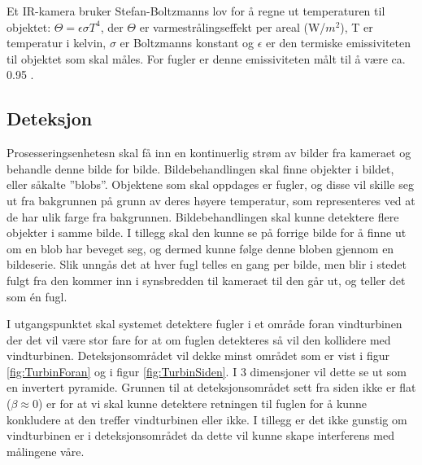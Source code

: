 Et IR-kamera bruker Stefan-Boltzmanns lov for å regne ut temperaturen til objektet: $\Theta=\epsilon \sigma T^4$, der $\Theta$ er varmestrålingseffekt per areal (W/$m^2$), T er temperatur i kelvin, $\sigma$ er Boltzmanns konstant og $\epsilon$ er den termiske emissiviteten til objektet som skal måles. For fugler er denne emissiviteten målt til å være ca. 0.95 \cite{fuglemm}.


\subsection{Deteksjon}

Prosesseringsenhetesn skal få inn en kontinuerlig strøm av bilder fra kameraet og behandle denne bilde for bilde. Bildebehandlingen skal finne objekter i bildet, eller såkalte ''blobs''. Objektene som skal oppdages er fugler, og disse vil skille seg ut fra bakgrunnen på grunn av deres høyere temperatur, som representeres ved at de har ulik farge fra bakgrunnen. Bildebehandlingen skal kunne detektere flere objekter i samme bilde. I tillegg skal den kunne se på forrige bilde
for å finne ut om en blob har beveget seg, og dermed kunne følge denne bloben gjennom en bildeserie. Slik unngås det at hver fugl telles en gang per bilde, men blir i stedet fulgt fra den kommer inn i synsbredden til kameraet til den går ut, og teller det som én fugl.

I utgangspunktet skal systemet detektere fugler i et område foran vindturbinen der det vil være stor fare for at om fuglen detekteres så vil den kollidere med vindturbinen. Deteksjonsområdet vil dekke minst området som er vist i figur \ref{fig:TurbinForan} og i figur \ref{fig:TurbinSiden}. I 3 dimensjoner vil dette se ut som en invertert pyramide. Grunnen til at deteksjonsområdet sett fra siden ikke er flat ($\beta \approx 0$) er for at vi skal kunne detektere retningen til fuglen for å kunne konkludere at den treffer vindturbinen eller ikke. I tillegg er det ikke gunstig om vindturbinen er i deteksjonsområdet da dette vil kunne skape interferens med målingene våre. 


